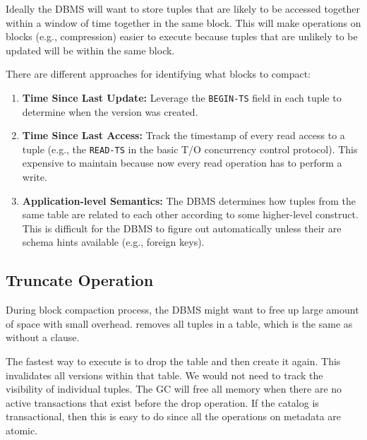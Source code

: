 \documentclass[11pt]{article}
\newcommand{\mvccField}[1]{\texttt{#1}\xspace}
\begin{document}
Ideally the DBMS will want to store tuples that are likely to be accessed together within a window 
of time together in the same block. This will make operations on blocks (e.g., compression) easier 
to execute because tuples that are unlikely to be updated will be within the same block.

There are different approaches for identifying what blocks to compact:
\begin{enumerate}
    \item \textbf{Time Since Last Update:}
    Leverage the \mvccField{BEGIN-TS} field in each tuple to determine when the version was created.
    
    \item \textbf{Time Since Last Access:}
    Track the timestamp of every read access to a tuple (e.g., the \mvccField{READ-TS} in the basic 
    T/O concurrency control protocol). This expensive to maintain because now every read 
    operation has to perform a write.
    
    \item \textbf{Application-level Semantics:} 
    The DBMS determines how tuples from the same table are related to each 
    other according to some higher-level construct. This is difficult for the DBMS to figure out 
    automatically unless their are schema hints available (e.g., foreign keys).
\end{enumerate}

\subsection*{Truncate Operation}
During block compaction process, the DBMS might want to free up large amount of space with small 
overhead.  removes all tuples in a table, which is the same as  without a 
 clause. 

The fastest way to execute  is to drop the table and then create it again. This 
invalidates all versions within that table. We would not need to track the visibility of individual 
tuples. The GC will free all memory when there are no active transactions that exist before the drop 
operation. If the catalog is transactional, then this is easy to do since all the operations on 
metadata are atomic.

\newpage


\end{document}
